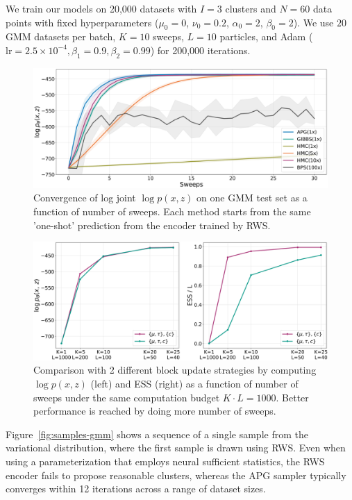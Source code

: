 \documentclass{article}
\theoremstyle{definition}
\begin{document}
We train our models on 20,000 datasets with $I = 3$ clusters and $N = 60$ data points with fixed hyperparameters ($\mu_0 = 0$, $\nu_0 = 0.2$, $\alpha_0 = 2$, $\beta_0 = 2$). We use $20$ GMM datasets per batch, $K=10$ sweeps, $L=10$ particles, and Adam ($\mathrm{lr} = 2.5 \times 10^{-4}, \beta_1 = 0.9, \beta_2 = 0.99$) for 200,000 iterations.
\begin{figure}[t!]
\centering
\includegraphics[width=\columnwidth]{figures/convergence_gmm_hmc1x.pdf}
  \caption{Convergence of log joint $\log p(x, z)$ on one GMM test set as a function of number of sweeps. Each method starts from the same 'one-shot' prediction from the encoder trained by RWS.}
  \label{fig:convergence-gmm}
\end{figure}
\begin{figure}[t!]
\centering
\includegraphics[width=\columnwidth]{figures/budget_gmm.pdf}
  \caption{Comparison with 2 different block update strategies by computing $\log p(x, z)$ (left) and ESS (right) as a function of number of sweeps under the same computation budget $K \cdot L = 1000$. Better performance is reached by doing more number of sweeps.}
  \label{fig:fixed-budget-gmm}
\end{figure}
Figure~\ref{fig:samples-gmm} shows a sequence of a single sample from the variational distribution, where the first sample is drawn using RWS. Even when using a parameterization that employs neural sufficient statistics, the RWS encoder fails to propose reasonable clusters, whereas the APG sampler typically converges within 12 iterations across a range of dataset sizes.
\end{document}
